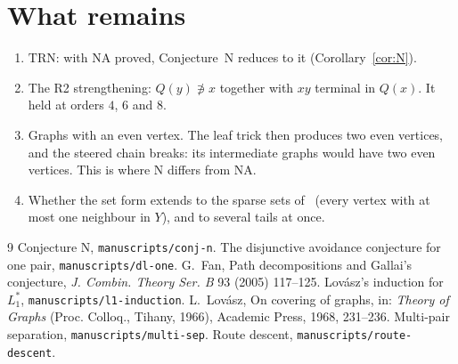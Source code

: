 \documentclass[11pt]{amsart}
\theoremstyle{definition}
\newcommand{\TRN}{\mathrm{TRN}}
\begin{document}
\section{What remains}\label{sec:open}
\begin{enumerate}
\item $\TRN$: with NA proved, Conjecture~N reduces to it (Corollary~\ref{cor:N}).
\item The R2 strengthening: $Q(y)\not\ni x$ together with $xy$ terminal in $Q(x)$. It held at orders
$4$, $6$ and $8$.
\item Graphs with an even vertex. The leaf trick then produces two even vertices, and the steered chain
breaks: its intermediate graphs would have two even vertices. This is where N differs from NA.
\item Whether the set form extends to the sparse sets of~\cite{MS} (every vertex with at most one
neighbour in $Y$), and to several tails at once.
\end{enumerate}

\begin{thebibliography}{9}
 Conjecture N, \texttt{manuscripts/conj-n}.
 The disjunctive avoidance conjecture for one pair, \texttt{manuscripts/dl-one}.
 G.~Fan, Path decompositions and Gallai's conjecture, \emph{J. Combin. Theory Ser.
B} 93 (2005) 117--125.
 Lov\'asz's induction for $L_1^*$, \texttt{manuscripts/l1-induction}.
 L.~Lov\'asz, On covering of graphs, in: \emph{Theory of Graphs} (Proc. Colloq.,
Tihany, 1966), Academic Press, 1968, 231--236.
 Multi-pair separation, \texttt{manuscripts/multi-sep}.
 Route descent, \texttt{manuscripts/route-descent}.
\end{thebibliography}
\end{document}

